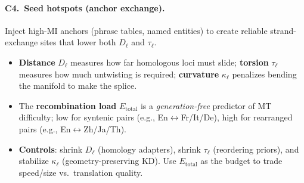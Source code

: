 \paragraph{C4.\ Seed hotspots (anchor exchange).} Inject high-MI anchors (phrase tables, named entities) to create reliable strand-exchange sites that lower both $D_\ell$ and $\tau_\ell$.

\begin{tcolorbox}[colback=black!3,colframe=black!40,title=\textbf{Key takeaways}]
\begin{itemize}[leftmargin=1.2em]
\item \textbf{Distance} $D_\ell$ measures how far homologous loci must slide; \textbf{torsion} $\tau_\ell$ measures how much untwisting is required; \textbf{curvature} $\kappa_\ell$ penalizes bending the manifold to make the splice.
\item The \textbf{recombination load} $E_{\text{total}}$ is a \emph{generation-free} predictor of MT difficulty; low for syntenic pairs (e.g., En$\leftrightarrow$Fr/It/De), high for rearranged pairs (e.g., En$\leftrightarrow$Zh/Ja/Th).
\item \textbf{Controls}: shrink $D_\ell$ (homology adapters), shrink $\tau_\ell$ (reordering priors), and stabilize $\kappa_\ell$ (geometry-preserving KD). Use $E_{\text{total}}$ as the budget to trade speed/size vs.\ translation quality.
\end{itemize}
\end{tcolorbox}



